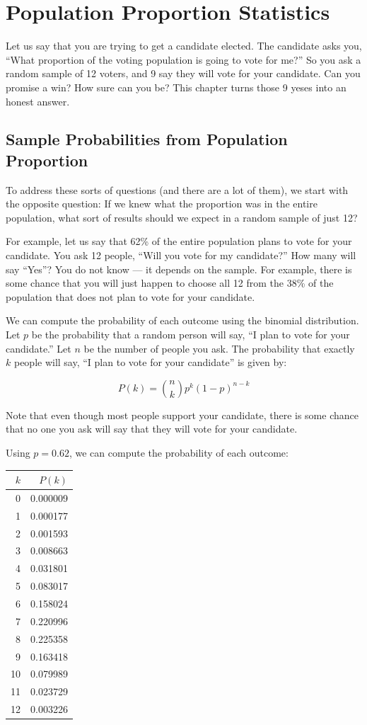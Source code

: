 \chapter{Population Proportion Statistics}

Let us say that you are trying to get a candidate elected. The candidate asks you, ``What proportion of the voting population is going to vote for me?'' 
So you ask a random sample of 12 voters, and 9 say they will vote for your candidate. Can you promise a win? How sure can you be? This chapter turns those 9 yeses into an honest answer.

\section{Sample Probabilities from Population Proportion}

To address these sorts of questions (and there are a lot of them), we start with the opposite question: If we knew what the proportion was in the 
entire population, what sort of results should we expect in a random sample of just 12?

For example, let us say that 62\% of the entire population plans to vote for your candidate. You ask 12 people, ``Will you vote for my candidate?'' How many will say ``Yes''? You do not know --- it depends
on the sample. For example, there is some chance that you will just happen to choose all 12 from the 38\% of the population that does not plan to vote for your candidate.

We can compute the probability of each outcome using the binomial distribution. Let $p$ be the probability that a random person will say, ``I plan to vote for your candidate.'' Let $n$ be the number of people 
you ask. The probability that exactly $k$ people will say, ``I plan to vote for your candidate'' is given by:

$$P(k) = \binom{n}{k}p^k(1-p)^{n-k}$$

Note that even though most people support your candidate, there is some chance that no one you ask will say that they will vote for your candidate. 

Using $p=0.62$, we can compute the probability of each outcome:


\begin{tabular}{r | r}
$k$ & $P(k)$ \\
\hline
0 & 0.000009 \\
1 & 0.000177 \\
2 & 0.001593 \\
3 & 0.008663 \\
4 & 0.031801 \\
5 & 0.083017 \\
6 & 0.158024 \\
7 & 0.220996 \\
8 & 0.225358 \\
9 & 0.163418 \\
10 & 0.079989 \\
11 & 0.023729 \\
12 & 0.003226
\end{tabular}

